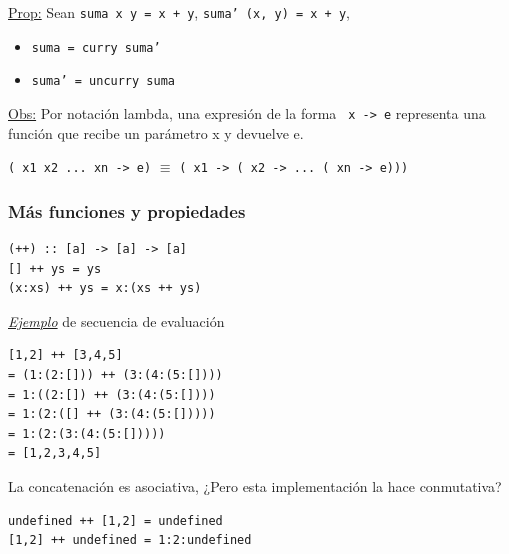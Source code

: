 \documentclass[12pt]{extarticle}
\def\propiedad{\underline{Prop:} }
\def\observacion{\underline{Obs:} }
\def\ejemplo{\textit{\underline{Ejemplo} }}
\newcommand\hsline[1]{\texttt{#1}}
\begin{document}
\propiedad Sean \hsline{suma x y = x + y}, \hsline{suma' (x, y) = x + y},
\begin{itemize}
\vspace{-0.2cm}
\setlength\itemsep{-0.4em}
  \item \hsline{suma = curry suma'}
  \item \hsline{suma' = uncurry suma}
\end{itemize}

\observacion Por notación lambda, una expresión de la forma 
\texttt{\ x -> e}
representa una función que recibe un parámetro x y devuelve e. \\
\vspace{-0.5cm}
\begin{center}
\texttt{(\ x1 x2 ... xn -> e)} $\equiv$ \texttt{(\ x1 -> (\ x2 -> ... (\ xn -> e)))}
\end{center}

\subsubsection{Más funciones y propiedades}
\begin{verbatim}
(++) :: [a] -> [a] -> [a]
[] ++ ys = ys
(x:xs) ++ ys = x:(xs ++ ys)
\end{verbatim}

\ejemplo de secuencia de evaluación

\begin{verbatim}
[1,2] ++ [3,4,5]
= (1:(2:[])) ++ (3:(4:(5:[])))
= 1:((2:[]) ++ (3:(4:(5:[])))
= 1:(2:([] ++ (3:(4:(5:[]))))
= 1:(2:(3:(4:(5:[]))))
= [1,2,3,4,5]
\end{verbatim}

La concatenación es asociativa, ¿Pero esta implementación la hace conmutativa?
\begin{verbatim}
undefined ++ [1,2] = undefined
[1,2] ++ undefined = 1:2:undefined
\end{verbatim}
\end{document}
